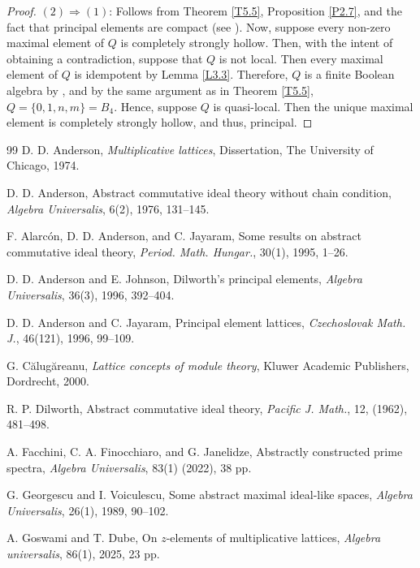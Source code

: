 \documentclass[11pt,english]{amsart}
\theoremstyle{definition}
\numberwithin{equation}{section}
\theoremstyle{remark}
\begin{document}
	\begin{proof}
		$(2)\Rightarrow(1)$: Follows from Theorem \ref{T5.5}, Proposition \ref{P2.7}, and the fact that principal elements are compact (see \cite[Theorem~2.1]{And-ACIT-1976}). Now,  suppose every non-zero maximal element of $Q$ is completely strongly hollow. Then, with the intent of obtaining a contradiction, suppose that $Q$ is not local. Then every maximal element of $Q$ is idempotent by Lemma \ref{L3.3}. Therefore, $Q$ is a finite Boolean algebra by \cite[Theorem~2.3]{Abs-CIT}, and by the same argument as in Theorem \ref{T5.5}, $Q=\{0,1,n,m\}=B_4$. Hence, suppose $Q$ is quasi-local. Then the unique maximal element is completely strongly hollow, and thus, principal. 
	\end{proof}
	\smallskip
	
	\begin{thebibliography}{99}
		 D. D. Anderson, \emph{Multiplicative lattices}, Dissertation, The University of Chicago, 1974.
		
		 D. D. Anderson,  Abstract commutative ideal theory without chain condition, \emph{Algebra Universalis}, 6(2), 1976, 131--145.
		
		 F. Alarc\'on,  D. D. Anderson, and C. Jayaram, Some results on abstract commutative ideal theory, \emph{Period. Math. Hungar.}, 30(1), 1995, 1--26.
		
		 D. D. Anderson and E. Johnson,  Dilworth's principal elements, \emph{Algebra Universalis}, 36(3), 1996, 392--404.
		
		 D. D. Anderson and C. Jayaram,  Principal element lattices, \emph{Czechoslovak Math. J.}, 46(121), 1996, 99--109.
		
		G. C\u{a}lug\u{a}reanu, \emph{Lattice concepts of module theory}, Kluwer Academic Publishers, Dordrecht, 2000.
		
		 R. P. Dilworth,  Abstract commutative ideal theory,  \emph{Pacific J. Math.}, 12, (1962), 481–498.
		
		A. Facchini,  C. A. Finocchiaro, and G. Janelidze,  Abstractly constructed prime spectra,  \emph{Algebra Universalis}, 83(1)
		(2022), 38 pp.
		
		G. Georgescu and I. Voiculescu,  Some abstract maximal ideal-like spaces, \emph{Algebra Universalis}, 26(1), 1989, 90--102.
		
		 A. Goswami and T. Dube,  On $z$-elements of multiplicative lattices, \emph{Algebra universalis}, 86(1), 2025, 23 pp.
		

\end{thebibliography}
\end{document}
